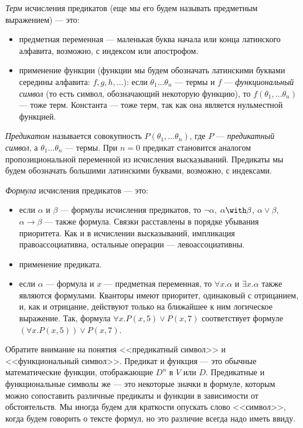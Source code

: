 \documentclass[12pt,a4paper,oneside]{article}
\begin{document}
\begin{definition}\emph{Терм} исчисления предикатов (еще мы его будем
называть предметным выражением) --- это:
\begin{itemize}
\item предметная переменная --- маленькая буква начала или конца латинского 
алфавита, возможно, с индексом или апострофом.
\item применение функции (функции мы будем обозначать латинскими 
буквами середины алфавита: $f, g, h, \dots$):
если $\theta_1 \dots \theta_n$ --- термы и $f$ --- 
\emph{функциональный символ} (то есть символ, обозначающий некоторую
функцию), то $f (\theta_1, \dots \theta_n)$ 
--- тоже терм. Константа --- тоже терм, так как она является нульместной функцией.
\end{itemize}
\end{definition}
\begin{definition}
\emph{Предикатом} называется совокупность $P (\theta_1, \dots \theta_n)$, где $P$ --- \emph{предикатный символ}, а $\theta_1 \dots \theta_n$ --- термы. При $n  = 0$ предикат становится аналогом пропозициональной переменной из исчисления высказываний. Предикаты мы будем обозначать большими латинскими буквами, возможно, с индексами.
\end{definition}
\begin{definition}\emph{Формула} исчисления предикатов --- это:
\begin{itemize}
\item если $\alpha$ и $\beta$ --- формулы исчисления предикатов, то 
$\neg \alpha$, $\alpha \with \beta$, $\alpha \vee \beta$, 
$\alpha \rightarrow \beta$ --- также формула. Связки расставлены
в порядке убывания приоритета. Как и в исчислении высказываний,
импликация правоассоциативна, остальные операции --- левоассоциативны.
\item применение предиката.
\item если $\alpha$ --- формула и $x$ --- предметная переменная, то
$\forall x. \alpha$ и $\exists x. \alpha$ также являются формулами. Кванторы
имеют приоритет, одинаковый с отрицанием, и, как и отрицание, действуют 
только на ближайшее к ним логическое выражение. Так, формула 
$\forall x. P(x,5) \vee P(x,7)$ соответствует формуле $(\forall x. P(x,5)) \vee P(x,7)$.
\end{itemize}
\end{definition}

Обратите внимание на понятия <<предикатный символ>> и <<функциональный символ>>.
Предикат и функция --- это обычные математические функции, отображающие
$D^n$ в $V$ или $D$. Предикатные и функциональные символы же --- это 
некоторые значки в формуле, которым можно сопоставить различные предикаты и 
функции в зависимости от обстоятельств. Мы иногда будем для краткости
опускать слово <<символ>>, когда будем говорить о тексте формул, но 
это различие всегда надо иметь ввиду.
\end{document}
